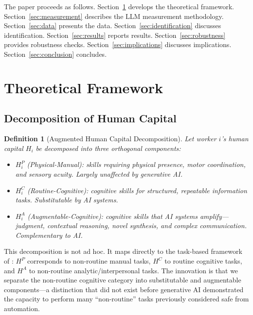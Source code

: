 \documentclass[12pt,a4paper]{article}
\newtheorem{definition}{Definition}
\begin{document}
The paper proceeds as follows. Section~\ref{sec:theory} develops the theoretical framework. Section~\ref{sec:measurement} describes the LLM measurement methodology. Section~\ref{sec:data} presents the data. Section~\ref{sec:identification} discusses identification. Section~\ref{sec:results} reports results. Section~\ref{sec:robustness} provides robustness checks. Section~\ref{sec:implications} discusses implications. Section~\ref{sec:conclusion} concludes.


\section{Theoretical Framework}
\label{sec:theory}

\subsection{Decomposition of Human Capital}

\begin{definition}[Augmented Human Capital Decomposition]
Let worker $i$'s human capital $H_i$ be decomposed into three orthogonal components:
\begin{itemize}
\item $H_i^P$ (Physical-Manual): skills requiring physical presence, motor coordination, and sensory acuity. Largely unaffected by generative AI.
\item $H_i^C$ (Routine-Cognitive): cognitive skills for structured, repeatable information tasks. \textit{Substitutable} by AI systems.
\item $H_i^A$ (Augmentable-Cognitive): cognitive skills that AI systems amplify---judgment, contextual reasoning, novel synthesis, and complex communication. \textit{Complementary} to AI.
\end{itemize}
\end{definition}

This decomposition is not ad hoc. It maps directly to the task-based framework of \citet{autor2003skill}: $H^P$ corresponds to non-routine manual tasks, $H^C$ to routine cognitive tasks, and $H^A$ to non-routine analytic/interpersonal tasks. The innovation is that we separate the non-routine cognitive category into substitutable and augmentable components---a distinction that did not exist before generative AI demonstrated the capacity to perform many ``non-routine'' tasks previously considered safe from automation.
\end{document}
